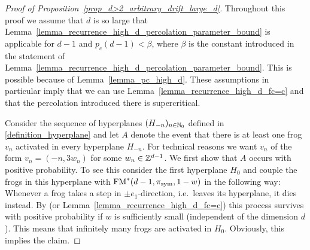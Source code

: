 \begin{proof}[Proof of Proposition~\ref{prop_d>2_arbitrary_drift_large_d}]
Throughout this proof we assume that $d$ is so large that Lemma~\ref{lemma_recurrence_high_d_percolation_parameter_bound} is applicable for $d-1$ and $p_c(d-1) < \beta$, where $\beta$ is the constant introduced in the statement of Lemma~\ref{lemma_recurrence_high_d_percolation_parameter_bound}. This is possible because of Lemma~\ref{lemma_pc_high_d}. These assumptions in particular imply that we can use Lemma~\ref{lemma_recurrence_high_d_fc=c} and that the percolation introduced there is supercritical.

Consider the sequence of hyperplanes $(H_{-n})_{n \in \mathbb{N}_0}$ defined in \eqref{definition_hyperplane} and let $A$ denote the event that there is at least one frog $v_n$ activated in every hyperplane $H_{-n}$. For technical reasons we want $v_n$ of the form $v_n = (-n, 3w_n)$ for some $w_n \in \mathbb{Z}^{d-1}$. We first show that $A$ occurs with positive probability. To see this consider the first hyperplane $H_0$ and couple the frogs in this hyperplane with $\operatorname{FM}^*(d-1, \pi_{\text{sym}}, 1-w)$ in the following way: Whenever a frog takes a step in $\pm e_1$-direction, i.e.~leaves its hyperplane, it dies instead. By \cite[Theorem 1.8]{AMP02pt} (or Lemma~\ref{lemma_recurrence_high_d_fc=c}) this process survives with positive probability if $w$ is sufficiently small (independent of the dimension $d$). This means that infinitely many frogs are activated in $H_0$. Obviously, this implies the claim. 


\end{proof}
